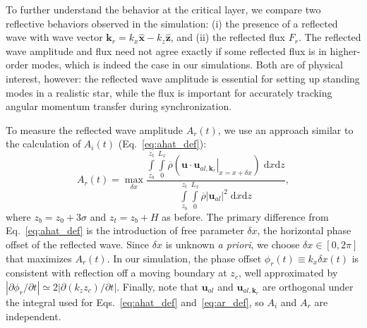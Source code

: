 \documentclass[
        fleqn,
        usenatbib,
        referee,
    ]{mnras}
\newcommand*{\pdil}[2]{\partial#1/\partial#2}
\newcommand*{\at}[1]{\left.#1\right|}
\newcommand*{\abs}[1]{\left|#1\right|}
\newcommand*{\p}[1]{\left(#1\right)}
\newcommand*{\bm}[1]{\mathbf{#1}}
\newcommand*{\uv}[1]{\hat{\mathbf{#1}}}
\begin{document}
To further understand the behavior at the critical layer, we compare two
reflective behaviors observed in the simulation: (i) the presence of a reflected
wave with wave vector $\bm{k}_r = k_{x}\uv{x} - k_{z}\uv{z}$, and (ii) the
reflected flux $F_r$. The reflected wave amplitude and flux need not agree
exactly if some reflected flux is in higher-order modes, which is indeed the
case in our simulations. Both are of physical interest, however: the reflected
wave amplitude is essential for setting up standing modes in a realistic star,
while the flux is important for accurately tracking angular momentum transfer
during synchronization.

To measure the reflected wave amplitude $A_r(t)$, we use an approach similar to
the calculation of $A_i(t)$ (Eq.~\eqref{eq:ahat_def}):
\begin{equation}
    A_r(t) = \max_{\delta x}\frac{\int\limits_{z_b}^{z_t}\int\limits_0^{L_x}
        \overline{\rho}\p{\bm{u} \cdot \at{\bm{u}_{al,
        \bm{k}_r}}_{x = x + \delta x}}\;\mathrm{d}x\mathrm{d}z}
        {\int\limits_{z_b}^{z_t}\int\limits_0^{L_x}
        \overline{\rho}\abs{\bm{u}_{al}}^2\;\mathrm{d}x\mathrm{d}z},
        \label{eq:ar_def}
\end{equation}
where $z_b = z_0 + 3\sigma$ and $z_t = z_b + H$ as before. The primary
difference from Eq.~\eqref{eq:ahat_def} is the introduction of free parameter
$\delta x$, the horizontal phase offset of the reflected wave. Since $\delta x$
is unknown \emph{a priori}, we choose $\delta x \in [0, 2\pi]$ that maximizes
$A_r(t)$. In our simulation, the phase offset $\phi_r(t) \equiv k_x \delta x(t)
$ is consistent with reflection off a moving boundary at $z_c$, well
approximated by $\abs{\pdil{\phi_r}{t}} \simeq 2\abs{\pdil{(k_{z}z_c)}{t}}$.
Finally, note that $\bm{u}_{al}$ and $\bm{u}_{al, \bm{k}_r}$ are orthogonal
under the integral used for Eqs.~\eqref{eq:ahat_def} and~\eqref{eq:ar_def}, so
$A_i$ and $A_r$ are independent.
\end{document}

